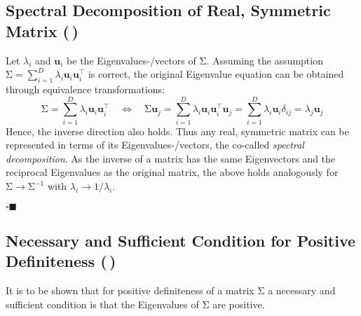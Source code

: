\documentclass[11pt, a4paper]{scrartcl}
\newcommand{\transposed}{{\!\top\!}}
\renewcommand{\vec}[1]{\bm{#1}}
\newcommand{\mat}[1]{\bm{\mathrm{#1}}}
\newcommand{\qedeot}{\hfill\(\square\blacksquare\)}
\newcommand{\diffstar}{\texorpdfstring{\raisebox{-1pt}{\resizebox{!}{8pt}{\(\star\)}}}{*}}
\newcommand{\twostar}  {(\diffstar\,\diffstar)}
\begin{document}
		\subsection{Spectral Decomposition of Real, Symmetric Matrix  \twostar}
			Let \( \lambda_i \) and \( \vec{u}_i \) be the Eigenvalues-/vectors of \( \mat{\Sigma} \). Assuming the assumption \( \mat{\Sigma} = \sum_{i = 1}^{D} \lambda_i \vec{u}_i \vec{u}_i^\transposed \) is correct, the original Eigenvalue equation can be obtained through equivalence transformations:
			\begin{equation}
				\mat{\Sigma} = \sum_{i = 1}^{D} \lambda_i \vec{u}_i \vec{u}_i^\transposed
				\quad\iff\quad
				\mat{\Sigma} \vec{u}_j = \sum_{i = 1}^{D} \lambda_i \vec{u}_i \vec{u}_i^\transposed \vec{u}_j
				                       = \sum_{i = 1}^{D} \lambda_i \vec{u}_i \delta_{ij}
				                       = \lambda_j \vec{u}_j
			\end{equation}
			Hence, the inverse direction also holds. Thus any real, symmetric matrix can be represented in terms of its Eigenvalues-/vectors, the co-called \emph{spectral decomposition}. As the inverse of a matrix has the same Eigenvectors and the reciprocal Eigenvalues as the original matrix, the above holds analogously for \( \mat{\Sigma} \to \mat{\Sigma}^{-1} \) with \( \lambda_i \to 1/\lambda_i \).

			\qedeot

		\subsection{Necessary and Sufficient Condition for Positive Definiteness  \twostar}
			It is to be shown that for positive definiteness of a matrix \(\mat{\Sigma}\) a necessary and sufficient condition is that the Eigenvalues of \(\mat{\Sigma}\) are positive.
\end{document}
